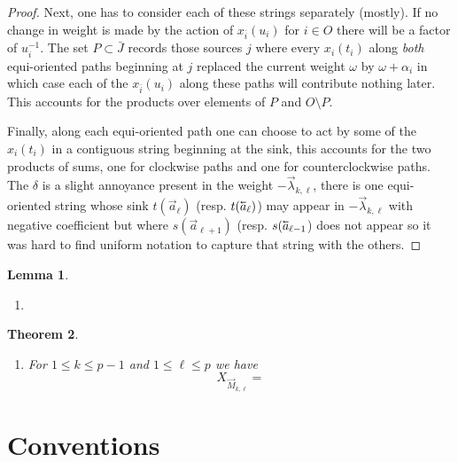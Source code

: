 \documentclass[11pt]{amsart}
\newcommand{\cev}[1]{\reflectbox{\!\ensuremath{\vec{\,\reflectbox{\ensuremath{#1}}}}}}
\newtheorem{theorem}{Theorem}[section]
\newtheorem{lemma}[theorem]{Lemma}
\numberwithin{equation}{section}
\begin{document}
{\begin{proof}
    Next, one has to consider each of these strings separately (mostly).  If no change in weight is made by the action of $x_{\bar{i}}(u_i)$ for $i\in O$ there will be a factor of $u_i^{-1}$.  The set $P\subset\bar{J}$ records those sources $j$ where every $x_i(t_i)$ along \emph{both} equi-oriented paths beginning at $j$ replaced the current weight $\omega$ by $\omega+\alpha_i$ in which case each of the $x_{\bar{i}}(u_i)$ along these paths will contribute nothing later.  This accounts for the products over elements of $P$ and $O\setminus P$.

    Finally, along each equi-oriented path one can choose to act by some of the $x_i(t_i)$ in a contiguous string beginning at the sink, this accounts for the two products of sums, one for clockwise paths and one for counterclockwise paths.  The $\delta$ is a slight annoyance present in the weight $-\vec{\lambda}_{k,\ell}$, there is one equi-oriented string whose sink $t(\vec{a}_\ell)$ (resp. $t(\cev{a}_\ell)$) may appear in $-\vec{\lambda}_{k,\ell}$ with negative coefficient but where $s(\vec{a}_{\ell+1})$ (resp. $s(\cev{a}_{\ell-1}$) does not appear so it was hard to find uniform notation to capture that string with the others.
  \end{proof}}%

  \begin{lemma}\mbox{}
    \begin{enumerate}
      \item 
    \end{enumerate}
  \end{lemma}

  \begin{theorem}\mbox{}
    \begin{enumerate}
      \item For $1\le k\le p-1$ and $1\le\ell\le p$ we have
      \begin{equation}
        X_{\vec{M}_{k,\ell}}=
      \end{equation}
    \end{enumerate}
  \end{theorem}


\section{Conventions}
\end{document}
